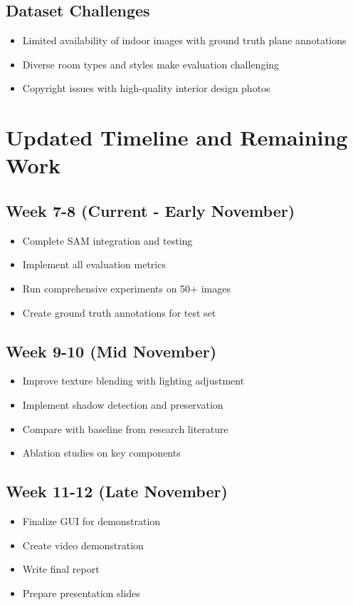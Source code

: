 \documentclass[11pt]{article}
\begin{document}
\subsection{Dataset Challenges}
\begin{itemize}
    \item Limited availability of indoor images with ground truth plane annotations
    \item Diverse room types and styles make evaluation challenging
    \item Copyright issues with high-quality interior design photos
\end{itemize}

\section{Updated Timeline and Remaining Work}

\subsection{Week 7-8 (Current - Early November)}
\begin{itemize}
    \item Complete SAM integration and testing
    \item Implement all evaluation metrics
    \item Run comprehensive experiments on 50+ images
    \item Create ground truth annotations for test set
\end{itemize}

\subsection{Week 9-10 (Mid November)}
\begin{itemize}
    \item Improve texture blending with lighting adjustment
    \item Implement shadow detection and preservation
    \item Compare with baseline from research literature
    \item Ablation studies on key components
\end{itemize}

\subsection{Week 11-12 (Late November)}
\begin{itemize}
    \item Finalize GUI for demonstration
    \item Create video demonstration
    \item Write final report
    \item Prepare presentation slides
\end{itemize}
\end{document}
